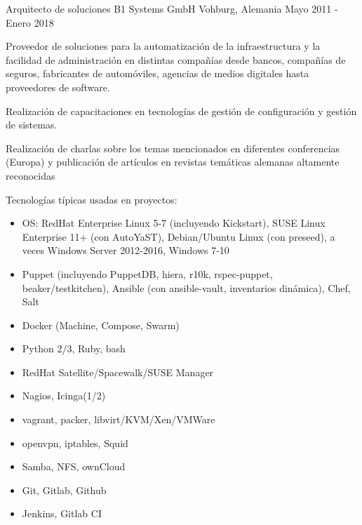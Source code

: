 \begin{cventries}

  \cventry
  {Arquitecto de soluciones}
  {B1 Systems GmbH} %
  {Vohburg, Alemania} %
  {Mayo 2011 - Enero 2018} %
    {
      \begin{cvitems} %
      \item Proveedor de soluciones para la automatización de la infraestructura y la facilidad de
      administración en distintas compañías desde bancos, compañías de seguros, fabricantes de
      automóviles, agencias de medios digitales hasta proveedores de software.
      \item Realización de capacitaciones en tecnologías de gestión de configuración y gestión de sistemas.
      \item Realización de charlas sobre los temas mencionados en diferentes conferencias (Europa) y
      publicación de artículos en revistas temáticas alemanas altamente reconocidas
      \item Tecnologías típicas usadas en proyectos:
          \begin{itemize}
            \item OS: RedHat Enterprise Linux 5-7 (incluyendo Kickstart), SUSE Linux Enterprise 11+
              (con AutoYaST), Debian/Ubuntu Linux (con preseed), a veces Windows Server 2012-2016, Windows 7-10
            \item Puppet (incluyendo PuppetDB, hiera, r10k, rspec-puppet, beaker/testkitchen),
              Ansible (con ansible-vault, inventarios dinámica), Chef, Salt
            \item Docker (Machine, Compose, Swarm)
            \item Python 2/3, Ruby, bash
            \item RedHat Satellite/Spacewalk/SUSE Manager
            \item Nagios, Icinga(1/2)
            \item vagrant, packer, libvirt/KVM/Xen/VMWare
            \item openvpn, iptables, Squid
            \item Samba, NFS, ownCloud
            \item Git, Gitlab, Github
            \item Jenkins, Gitlab CI
          \end{itemize}
      \end{cvitems}
    }


\end{cventries}
